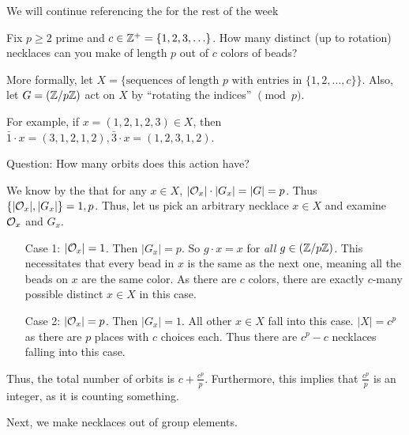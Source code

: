 \documentclass[notes.tex]{subfile}
\begin{document}
We will continue referencing the  for the rest of the week

\begin{eg}
	Fix $p\ge 2$ prime and $c\in \mathbb{Z}^+ = \{1, 2, 3, \ldots\}$.
	How many distinct (up to rotation) necklaces can you make of length $p$ out of $c$ colors of beads?

	More formally, let $X= \{\text{sequences of length } p \text{ with entries in } \{1,2,\ldots, c\}\}$.
	\tabularnewline
	Also, let $G  = (\mathbb{Z}/{p}\mathbb{Z})$ act on $X$ by ``rotating the indices'' $\pmod p$.

	For example, if $x = (1,2,1,2,3)\in X$, then $\bar 1\cdot x = (3,1,2,1,2), \bar 3\cdot x = (1,2,3,1,2)$.

	Question: How many orbits does this action have?

	We know by the  that for any $x\in X$, $|\mathcal{O}_x|\cdot|G_x| = |G| = p$. Thus $\{|\mathcal{O}_x|, |G_x|\} = {1, p}$.
	Thus, let us pick an arbitrary necklace $x\in X$ and examine $\mathcal{O}_x$ and $G_x$.
	\begin{itemize}
		\item[Case 1:] $|\mathcal{O}_x| = 1$. Then $|G_x| = p$. So $g\cdot x=x$ for \emph{all} $g\in (\mathbb{Z}/{p}\mathbb{Z})$. This necessitates that every bead in $x$ is the same as the next one, meaning all the beads on $x$ are the same color. As there are $c$ colors, there are exactly $c$-many possible distinct $x\in X$ in this case. 
		\item[Case 2:] $|\mathcal{O}_x| = p$. Then $|G_x| = 1$. All other $x\in X$ fall into this case. $|X| = c^p$ as there are $p$ places with $c$ choices each. Thus there are $c^p - c$ necklaces falling into this case.
	\end{itemize}

	Thus, the total number of orbits is $c+\frac{c^p}{p}$. Furthermore, this implies that $\frac{c^p}{p}$ is an integer, as it is counting something.
\end{eg}

Next, we make necklaces out of group elements.
\end{document}
